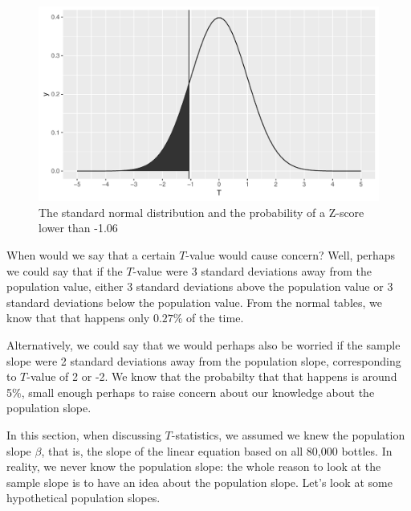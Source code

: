 \documentclass[]{report}\usepackage[]{graphicx}\usepackage[]{color}
\makeatletter
\def\maxwidth{ %
  \ifdim\Gin@nat@width>\linewidth
    \linewidth
  \else
    \Gin@nat@width
  \fi
}
\newenvironment{knitrout}{}{} %
\makeatother
\begin{document}
\begin{knitrout}
\color{fgcolor}\begin{figure}

{\centering \includegraphics[width=\maxwidth]{figure/inf_9b-1} 

}

\caption[The standard normal distribution and the probability of a Z-score lower than -1.06]{The standard normal distribution and the probability of a Z-score lower than -1.06}\label{fig:inf_9b}
\end{figure}


\end{knitrout}


When would we say that a certain $T$-value would cause concern? Well, perhaps we could say that if the $T$-value were 3 standard deviations away from the population value, either 3 standard deviations above the population value or 3 standard deviations below the population value. From the normal tables, we know that that happens only $0.27$\% of the time.

Alternatively, we could say that we would perhaps also be worried if the sample slope were 2 standard deviations away from the population slope, corresponding to $T$-value of 2 or -2. We know that the probabilty that that happens is around 5\%, small enough perhaps to raise concern about our knowledge about the population slope.

In this section, when discussing $T$-statistics, we assumed we knew the population slope $\beta$, that is, the slope of the linear equation based on all 80,000 bottles. In reality, we never know the population slope: the whole reason to look at the sample slope is to have an idea about the population slope. Let's look at some hypothetical population slopes.
\end{document}
